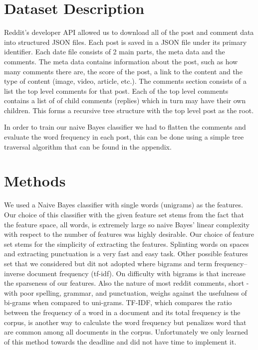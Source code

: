 \documentclass[10pt,twocolumn]{article}
\begin{document}
\section{Dataset Description}

Reddit's developer API allowed us to download all of the post and comment data into structured JSON files. Each post is saved in a JSON file under its primary identifier. Each date file consists of 2 main parts, the meta data and the comments. The meta data contains information about the post, such as how many comments there are, the score of the post, a link to the content and the type of content (image, video, article, etc.). The comments section consists of a list the top level comments for that post. Each of the top level comments contains a list of of child comments (replies) which in turn may have their own children. This forms a recursive tree structure with the top level post as the root. 

In order to train our naive Bayes classifier we had to flatten the comments and evaluate the word frequency in each post, this can be done using a simple tree traversal algorithm that can be found in the appendix. 

\section{Methods}
We used a Naive Bayes classifier with single words (unigrams) as the features. Our choice of this classifier with the given feature set stems from the fact that the feature space, all words, is extremely large so naive Bayes' linear complexity with respect to the number of features was highly desirable. Our choice of feature set stems for the simplicity of extracting the features. Splinting words on spaces and extracting punctuation is a very fast and easy task. Other possible features set that we considered but dit not adopted where bigrams and term frequency–inverse document frequency (tf-idf). On difficulty with bigrams is that increase the sparseness of our features. Also the nature of most reddit comments, short - with poor spelling, grammar, and punctuation, weighs against the usefulness of bi-grams when compared to uni-grams. TF-IDF, which compares the ratio between the frequency of a word in a document and its total frequency is the corpus, is another way to calculate the word frequency but penalizes word that are common among all documents in the corpus. Unfortunately we only learned of this method towards the deadline and did not have time to implement it.
\end{document}
